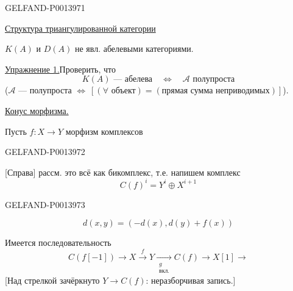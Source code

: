 \begin{GelfandAdjacentEvidence}{GELFAND-P001397}{1}

\uline{Структура триангулированной категории}

\(K(A)\) и \(D(A)\) не явл. абелевыми категориями.

\uline{Упражнение 1.}\quad Проверить, что
\[
K(A)\text{ --- абелева}\quad\Longleftrightarrow\quad
\mathcal A\text{ полупроста}
\]
(\(\mathcal A\) --- полупроста \(\Longleftrightarrow\
[(\forall\text{ объект})=(\text{прямая сумма неприводимых})]\)).

\uline{Конус морфизма.}

Пусть \(f\colon X\longrightarrow Y\) морфизм комплексов

\end{GelfandAdjacentEvidence}
\begin{GelfandAdjacentEvidence}{GELFAND-P001397}{2}

[Справа] рассм. это всё как бикомплекс, т.е. напишем комплекс
\[
C(f)^i=Y^i\oplus X^{i+1}
\]
\end{GelfandAdjacentEvidence}
\begin{GelfandAdjacentEvidence}{GELFAND-P001397}{3}

\[
d(x,y)=(-d(x),d(y)+f(x))
\]

Имеется последовательность
\begin{equation*}
C(f[-1])\longrightarrow X\overset{f}{\longrightarrow}Y
\underset{\substack{g\\\text{вкл.}}}{\longrightarrow}C(f)
\longrightarrow X[1]\longrightarrow
\tag{4}
\end{equation*}
[Над стрелкой зачёркнуто \(Y\to C(f)\):
неразборчивая запись.]
\end{GelfandAdjacentEvidence}
